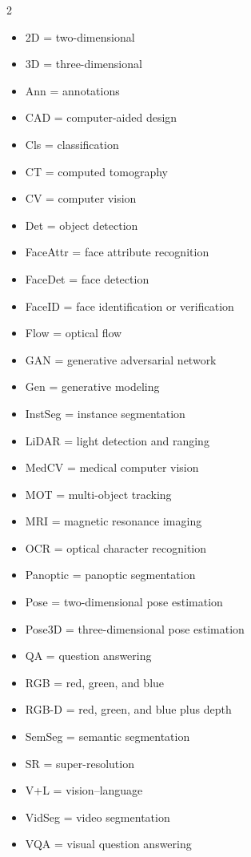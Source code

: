 \documentclass{article}
\begin{document}
\begin{multicols}{2}
    \begin{itemize}\setlength{\itemsep}{0cm}
        \item 2D = two-dimensional
        \item 3D = three-dimensional
        \item Ann = annotations
        \item CAD = computer-aided design
        \item Cls = classification
        \item CT = computed tomography
        \item CV = computer vision
        \item Det = object detection
        \item FaceAttr = face attribute recognition
        \item FaceDet = face detection
        \item FaceID = face identification or verification
        \item Flow = optical flow
        \item GAN = generative adversarial network
        \item Gen = generative modeling
        \item InstSeg = instance segmentation
        \item LiDAR = light detection and ranging
        \item MedCV = medical computer vision
        \item MOT = multi-object tracking
        \item MRI = magnetic resonance imaging
        \item OCR = optical character recognition
        \item Panoptic = panoptic segmentation
        \item Pose = two-dimensional pose estimation
        \item Pose3D = three-dimensional pose estimation
        \item QA = question answering
        \item RGB = red, green, and blue
        \item RGB-D = red, green, and blue plus depth
        \item SemSeg = semantic segmentation
        \item SR = super-resolution
        \item V+L = vision--language
        \item VidSeg = video segmentation
        \item VQA = visual question answering
    \end{itemize}
\end{multicols}
\end{document}
